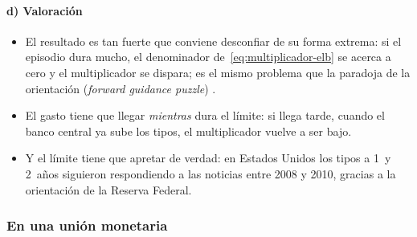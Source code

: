 \documentclass[11pt]{article}
\begin{document}
\paragraph{d) Valoración}

\begin{itemize}
\item El resultado es tan fuerte que conviene desconfiar de su forma extrema: si el episodio dura mucho, el denominador de~\eqref{eq:multiplicador-elb} se acerca a cero y el multiplicador se dispara; es el mismo problema que la paradoja de la orientación (\emph{forward guidance puzzle}) .
\item El gasto tiene que llegar \emph{mientras} dura el límite: si llega tarde, cuando el banco central ya sube los tipos, el multiplicador vuelve a ser bajo\nocite{ChristianoEichenbaumRebelo2011}.
\item Y el límite tiene que apretar de verdad: en Estados Unidos los tipos a 1~y 2~años siguieron respondiendo a las noticias entre 2008 y 2010, gracias a la orientación de la Reserva Federal\nocite{SwansonWilliams2014}.
\end{itemize}

\subsubsection{En una unión monetaria}\label{sec:union-monetaria}
\end{document}
